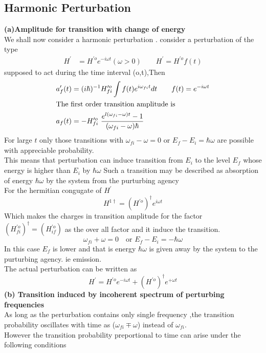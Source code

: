 \subsection{Harmonic Perturbation}
\textbf{(a)Amplitude for transition with change of energy}\\
We shall now consider a harmonic perturbation .
consider a perturbation of the type
\begin{align*}
H^\prime&=H^{\prime o}e^{-i\omega t} (\omega>0) \quad \quad  H^\prime=H^{\prime o}f(t)
\end{align*}
supposed to act during the time interval (o,t),Then
\begin{align*}
a^{\prime}_f (t)&=(i\hbar)^{-1}H^{\prime o}_{fi}\int f(t)e^{i\omega_{fi} t}  dt \quad \quad  f(t)=e^{-i\omega t}\\
\intertext{The first order transition amplitude is}
a_f(t)& =-H^{\prime o}_{fi}\ \frac{e^{l(\omega_{fi}-\omega)t}-1}{(\omega_{fi}-\omega)\hbar}
\end{align*}
For large $t$ only those transitions with $\omega_{fi}-\omega=0$ or $E_f-E_i=\hbar \omega$  are possible with appreciable probability.\\
This means that perturbation can induce transition from $E_i$ to the level $E_f$ whose energy is higher than $E_i$ by $\hbar \omega$
Such a transition may be described as absorption of energy $\hbar \omega$ by the system from the purturbing agency\\
For the hermitian congugate of $H^\prime$\\
$$ H^{1\dagger}=(H^{\prime o})^\dagger e^{i\omega t}$$
Which makes the charges in transition amplitude for the factor $(H^{\prime o}_{fi})^\dagger=(H^{\prime o}_{if})$ as the over all factor and it induce the transition.
$$\omega_{fi}+\omega=0\quad \text{or }E_f-E_i=-\hbar\omega $$
In this case $E_f$ is lower and that is energy $\hbar\omega$ is given away by the system to the purturbing agency. ie emission.\\
The actual perturbation can be written as 
$$ H^\prime=H^{\prime o}e^{-i \omega t}+(H^{\prime o})^\dagger e^{+\omega t}$$
\textbf{(b) Transition induced by incoherent spectrum of perturbing frequencies}\\
As long as the perturbation contains only single frequency ,the transition probability oscillates with time as ($\omega_{fi}\mp\omega$) instead of $\omega_{fi}$.\\
However the transition probability preportional to time can arise under the following conditions\\
